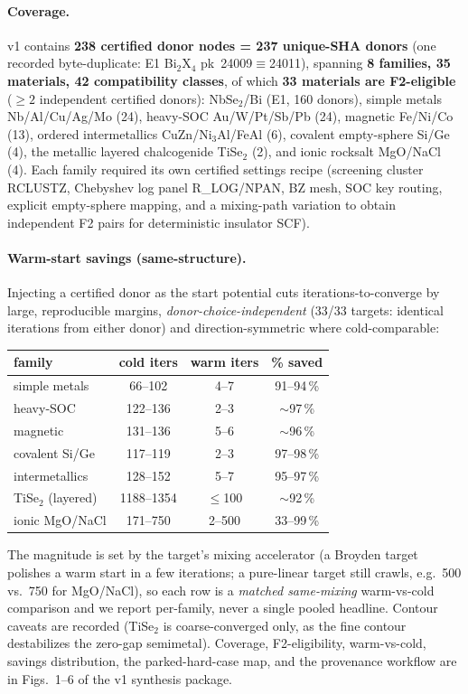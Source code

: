 \documentclass[11pt]{article}
\begin{document}
\paragraph{Coverage.} v1 contains \textbf{238 certified donor nodes = 237 unique-SHA donors} (one recorded
byte-duplicate: E1 Bi$_2$X$_4$ pk~24009$\equiv$24011), spanning \textbf{8 families, 35 materials, 42
compatibility classes}, of which \textbf{33 materials are F2-eligible} ($\ge 2$ independent certified donors):
NbSe$_2$/Bi (E1, 160 donors), simple metals Nb/Al/Cu/Ag/Mo (24), heavy-SOC Au/W/Pt/Sb/Pb (24), magnetic
Fe/Ni/Co (13), ordered intermetallics CuZn/Ni$_3$Al/FeAl (6), covalent empty-sphere Si/Ge (4), the metallic
layered chalcogenide TiSe$_2$ (2), and ionic rocksalt MgO/NaCl (4). Each family required its own certified
settings recipe (screening cluster RCLUSTZ, Chebyshev log panel R\_LOG/NPAN, BZ mesh, SOC key routing,
explicit empty-sphere mapping, and a mixing-path variation to obtain independent F2 pairs for deterministic
insulator SCF).

\paragraph{Warm-start savings (same-structure).} Injecting a certified donor as the start potential cuts
iterations-to-converge by large, reproducible margins, \emph{donor-choice-independent} (33/33 targets:
identical iterations from either donor) and direction-symmetric where cold-comparable:
\begin{center}\small
\begin{tabular}{lccc}
\toprule
family & cold iters & warm iters & \% saved \\
\midrule
simple metals & 66--102 & 4--7 & 91--94\,\% \\
heavy-SOC & 122--136 & 2--3 & $\sim$97\,\% \\
magnetic & 131--136 & 5--6 & $\sim$96\,\% \\
covalent Si/Ge & 117--119 & 2--3 & 97--98\,\% \\
intermetallics & 128--152 & 5--7 & 95--97\,\% \\
TiSe$_2$ (layered) & 1188--1354 & $\le$100 & $\sim$92\,\% \\
ionic MgO/NaCl & 171--750 & 2--500 & 33--99\,\% \\
\bottomrule
\end{tabular}
\end{center}
The magnitude is set by the target's mixing accelerator (a Broyden target polishes a warm start in a few
iterations; a pure-linear target still crawls, e.g.\ 500 vs.\ 750 for MgO/NaCl), so each row is a
\emph{matched same-mixing} warm-vs-cold comparison and we report per-family, never a single pooled headline.
Contour caveats are recorded (TiSe$_2$ is coarse-converged only, as the fine contour destabilizes the
zero-gap semimetal). Coverage, F2-eligibility, warm-vs-cold, savings distribution, the parked-hard-case map,
and the provenance workflow are in Figs.~1--6 of the v1 synthesis package.
\end{document}
